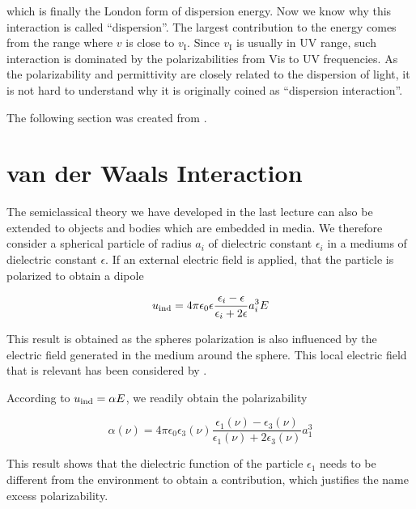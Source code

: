\documentclass[letterpaper,10pt,english]{sphinxmanual}
\begin{document}
\sphinxAtStartPar
which is finally the London form of dispersion energy. Now we know why this interaction is called “dispersion”. The largest contribution to the energy comes from the range where \(v\) is close to \(v_{\mathrm{I}}\). Since \(v_{\mathrm{I}}\) is usually in UV range, such interaction is dominated by the polarizabilities from Vis to UV frequencies. As the polarizability and permittivity are closely related to the dispersion of light, it is not hard to understand why it is originally
coined as “dispersion interaction”.



\sphinxAtStartPar
The following section was created from .


\chapter{van der Waals Interaction}
\label{\detokenize{notebooks/L11/1_van_der_Waals:van-der-Waals-Interaction}}\label{\detokenize{notebooks/L11/1_van_der_Waals::doc}}
\sphinxAtStartPar
The semiclassical theory we have developed in the last lecture can also be extended to objects and bodies which are embedded in media. We therefore consider a spherical particle of radius \(a_i\) of dielectric constant \(\epsilon_i\) in a mediums of dielectric constant \(\epsilon\). If an external electric field is applied, that the particle is polarized to obtain a dipole

\sphinxAtStartPar
\begin{equation}
u_{\rm ind}=4\pi \epsilon_0 \epsilon \frac{\epsilon_i-\epsilon}{\epsilon_i+2\epsilon}a_i^3E
\end{equation}

\sphinxAtStartPar
This result is obtained as the spheres polarization is also influenced by the electric field generated in the medium around the sphere. This local electric field that is relevant has been considered by .

\sphinxAtStartPar
According to \(u_{\rm ind}=\alpha E\), we readily obtain the polarizability

\sphinxAtStartPar
\begin{equation}
\alpha(\nu)=4\pi \epsilon_0 \epsilon_3(\nu)\frac{\epsilon_1(\nu)-\epsilon_3(\nu)}{\epsilon_1(\nu)+2\epsilon_3(\nu)}a_1^3
\end{equation}

\sphinxAtStartPar
This result shows that the dielectric function of the particle \(\epsilon_1\) needs to be different from the environment to obtain a contribution, which justifies the name excess polarizability.
\end{document}
